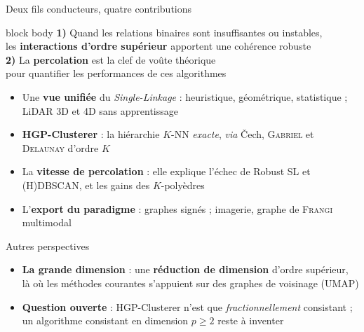 \begin{frame}[t]{Deux fils conducteurs, quatre contributions}
    \vspace{-0.10cm}
    \begin{beamercolorbox}[rounded=true,sep=3pt]{block body}
        \centering\small
        \textbf{1)} Quand les relations binaires sont insuffisantes ou instables,\\ les \textbf{interactions d'ordre supérieur} apportent une cohérence robuste\\[3pt]
        \textbf{2)} La \textbf{percolation} est la clef de voûte théorique\\ pour quantifier les performances de ces algorithmes
    \end{beamercolorbox}

    \vspace{0.06cm}
    \footnotesize
    \begin{itemize}
        \setlength{\itemsep}{3pt}
        \item Une \textbf{vue unifiée} du \emph{Single-Linkage} : heuristique, géométrique, statistique  ; LiDAR 3D et 4D sans apprentissage
        \item \textbf{HGP-Clusterer} : la hiérarchie $K$-NN \emph{exacte}, \emph{via} \v{C}ech, \textsc{Gabriel} et \textsc{Delaunay} d'ordre $K$   
        \item La \textbf{vitesse de percolation} : elle explique l'échec de Robust SL et (H)DBSCAN, et les gains des $K$-polyèdres 
        \item L'\textbf{export du paradigme} : graphes signés   ; imagerie, graphe de \textsc{Frangi} multimodal   
    \end{itemize}
\end{frame}

\begin{frame}{Autres perspectives}
    \begin{itemize}
        \setlength{\itemsep}{11pt}
        \item \textbf{La grande dimension} : une \textbf{réduction de dimension} d'ordre supérieur,
        là où les méthodes courantes s'appuient sur des graphes de voisinage (UMAP)
        \item \textbf{Question ouverte} : HGP-Clusterer n'est que \emph{fractionnellement} consistant ;
        un algorithme consistant en dimension $p \ge 2$ reste à inventer
    \end{itemize}
\end{frame}

